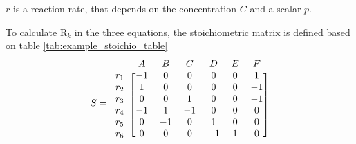 \documentclass{IEEEtran}
\begin{document}
\setlength\extrarowheight{-4pt}
\begin{table}[H]
\centering
 \caption{Summary of the stoichiometric reactions and its kinetics in the example model.}
 \label{tab:example_stoichio_table}
\end{table}

\setlength\extrarowheight{0pt}

$r$ is a reaction rate, that depends on the concentration $C$ and a scalar $p$.



To calculate R$_k$ in the three equations, the stoichiometric matrix is defined based on table \ref{tab:example_stoichio_table}  \\






\begin{equation}
\label{eq:stoi_example}
S =
\begin{blockarray}{l c c c c c c}
\begin{block}{l c c c c c c}
& A & B & C & D & E & F & \\
\end{block}
\begin{block}{l [c c c c c c]}
r_1 & -1 & 0  & 0  & 0  & 0 & 1 \\
r_2 & 1  & 0  & 0  & 0  & 0 & -1 \\
r_3 & 0  & 0  & 1  & 0  & 0 & -1 \\
r_4 & -1 & 1  & -1 & 0  & 0 &  0 \\
r_5 & 0  & -1 & 0  & 1  & 0 & 0 \\
r_6 & 0  & 0  & 0  & -1 & 1 & 0 \\
\end{block}
\end{blockarray}
\end{equation}
\end{document}
